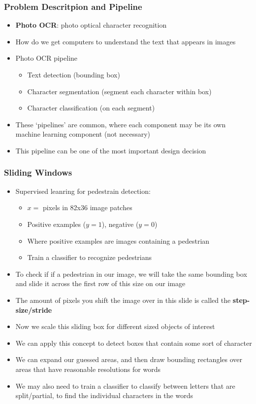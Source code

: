\subsubsection{Problem Descritpion and Pipeline}
\begin{itemize}[--]
	\item \textbf{Photo OCR}: photo optical character recognition
	\item How do we get computers to understand the text that appears in images
	\item Photo OCR pipeline
	\begin{itemize}[--]
		\item Text detection (bounding box)
		\item Character segmentation (segment each character within box)
		\item Character classification (on each segment)
	\end{itemize}
	\item These `pipelines' are common, where each component may be its own machine learning component (not necessary)
	\item This pipeline can be one of the most important design decision
\end{itemize}

\subsubsection{Sliding Windows}
\begin{itemize}[--]
	\item Supervised leanring for pedestrain detection:
	\begin{itemize}[--]
		\item $x=$ pixels in 82x36 image patches
		\item Positive examples ($y=1$), negative ($y=0$)
		\item Where positive examples are images containing a pedestrian
		\item Train a classifier to recognize pedestrians
	\end{itemize}
	\item To check if if a pedestrian in our image, we will take the same bounding box and slide it across the first row of this size on our image
	\item The amount of pixels you shift the image over in this slide is called the \textbf{step-size/stride}
	\item Now we scale this sliding box for different sized objects of interest
	\item We can apply this concept to detect boxes that contain some sort of character
	\item We can expand our guessed areas, and then draw bounding rectangles over areas that have reasonable resolutions for words
	\item We may also need to train a classifier to classify between letters that are split/partial, to find the individual characters in the words
\end{itemize}

